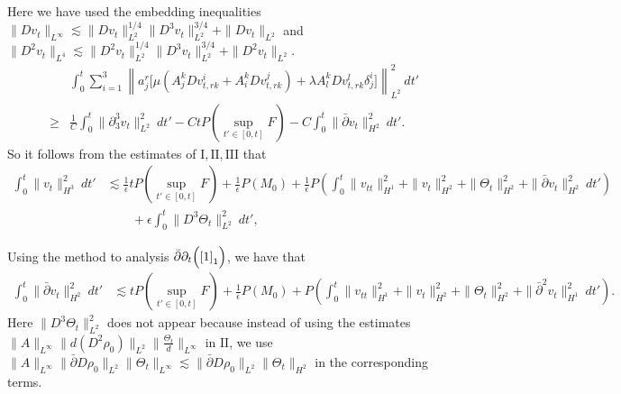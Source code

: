 \documentclass[12pt,a4paper]{amsart}
\numberwithin{equation}{section}
\theoremstyle{plain}
\theoremstyle{definition}
\newcommand{\bpartial}{\bar{\partial}}
\begin{document}
Here we have used the embedding inequalities
$\|Dv_t\|_{L^{\infty}}\lesssim \|Dv_t\|_{L^2}^{1/4}\|D^3v_t\|_{L^2}^{3/4}+\|Dv_t\|_{L^2}$ and $\|D^2v_t\|_{L^4}\lesssim \|D^2v_t\|_{L^2}^{1/4}\|D^3v_t\|_{L^2}^{3/4}+\|D^2v_t\|_{L^2}$.
\begin{align*}
&\int_{0}^{t}\sum\limits_{i=1}^3\left\| a^r_j\Big[\mu (A^{k}_j  Dv^i_{t,rk}+A^k_i Dv^j_{t,rk})+\lambda A_l^k  Dv^l_{t,rk}\delta^i_j\Big]   \right\|_{L^2}^2 \ dt'\\
\geq & \frac{1}{C}\int_{0}^{t}\|\partial_3^3 v_t\|_{L^2}^2 \ dt'-CtP(\sup\limits_{t'\in[0,t]}F)-C\int_{0}^{t} \|\bpartial v_t\|_{H^2}^2 \ dt'.
\end{align*}
So it follows from the estimates of $\mathrm{I},\mathrm{II},\mathrm{III}$ that
\begin{equation}
\label{dvtxx2}
\begin{aligned}
\int_{0}^{t}\| v_t\|_{H^3}^2 \ dt' &\lesssim  \frac{1}{\epsilon}tP(\sup\limits_{t'\in[0,t]}F)+\frac{1}{\epsilon}P(M_0)+\frac{1}{\epsilon}P\left(\int_{0}^{t}\|v_{tt}\|_{H^1}^2+\|v_t\|_{H^2}^2+\|\Theta_t\|_{H^2}^2 +\|\bpartial v_t\|_{H^2}^2\ dt'\right)\\
&\qquad+\epsilon \int_{0}^{t}\|D^3\Theta_t\|_{L^2}^2 \ dt',
\end{aligned}
\end{equation}


\vspace{0.3cm}
Using the method to analysis $\bpartial\partial_t  \Big(\eqref{1}_1\Big)$, we have that
\begin{equation}
\label{dvtxx1}
\begin{aligned}
\int_{0}^{t}\| \bpartial v_t\|_{H^2}^2 \ dt' &\lesssim tP(\sup\limits_{t'\in[0,t]}F)+\frac{1}{\epsilon}P(M_0)+P\left(\int_{0}^{t}\|v_{tt}\|_{H^1}^2+\|v_t\|_{H^2}^2+\|\Theta_t\|_{H^2}^2 +\|\bpartial^2 v_t\|_{H^1}^2\ dt'\right)
.
\end{aligned}
\end{equation}
Here $\|D^3\Theta_t\|_{L^2}^2$ does not appear because instead of using the estimates $\|A\|_{L^{\infty}} \|d (D^2 \rho_0)\|_{L^2} \|\frac{\Theta_t}{d}\|_{L^{\infty}}$ in $\mathrm{II}$, we use $\|A\|_{L^{\infty}} \| \bpartial D\rho_0\|_{L^2} \|\Theta_t\|_{L^{\infty}}\lesssim \|\bpartial D\rho_0\|_{L^2}\|\Theta_t\|_{H^2}$ in the corresponding terms.
\end{document}
